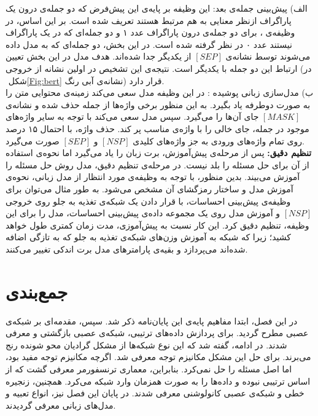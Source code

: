  الف) پیش‌بینی جمله‌ی بعد: این وظیفه بر پایه‌ی این پیش‌فرض که دو جمله‌ی درون یک پاراگراف ازنظر معنایی به هم مرتبط هستند تعریف شده است. بر این اساس،  در وظیفه‌ی ، برای دو جمله‌ی درون پاراگراف عدد ۱ و دو جمله‌ای که در یک پاراگراف نیستند عدد ۰ در نظر گرفته شده است. در این بخش، دو جمله‌ای که به مدل داده می‌شوند توسط نشانه‌ی $[SEP]$ از یکدیگر جدا شده‌اند. هدف مدل در این بخش تعیین ارتباط این دو جمله با یکدیگر است. نتیجه‌ی این تشخیص در اولین نشانه از خروجی (در شکل ‏\ref{Fig:bert} نشانه‌ی آبی رنگ) قرار دارد.\\
 ب) مدل‌سازی زبانی پوشیده : در این وظیفه مدل سعی می‌کند زمینه‌ی محتوایی متن را به صورت دوطرفه یاد بگیرد. به این منظور برخی واژه‌ها از جمله حذف شده و نشانه‌ی $[MASK]$ جای آن‌ها را می‌گیرد. سپس مدل سعی می‌کند با توجه به سایر واژه‌های موجود در جمله، جای خالی را با واژه‌ی مناسب پر کند. حذف واژه، با احتمال ۱۵ درصد روی تمام واژه‌های ورودی به جز واژه‌های کلیدی $[NSP]$ و $[SEP]$ صورت می‌گیرد.
 \\
\textbf{تنظیم دقیق:}
پس از مرحله‌ی پیش‌آموزش، برت زبان را یاد می‌گیرد اما نحوه‌ی استفاده از آن برای حل مسئله را بلد نیست. در مرحله‌ی تنظیم دقیق، مدل روش حل مسئله را آموزش می‌بیند. بدین منظور، با توجه به وظیفه‌ی مورد انتظار از مدل زبانی، نحوه‌ی آموزش مدل و ساختار رمزگشای آن مشخص می‌شود. به طور مثال می‌توان برای وظیفه‌ی پیش‌بینی احساسات، با قرار دادن یک شبکه‌ی تغذیه به جلو روی خروجی $[NSP]$ و آموزش مدل روی یک مجموعه داده‌ی پیش‌بینی احساسات، مدل را برای این وظیفه، تنظیم دقیق کرد. این کار نسبت به پیش‌آموزی، مدت زمان کمتری طول خواهد کشید؛ زیرا که شبکه به آموزش وزن‌های شبکه‌ی تغذیه به جلو که به تازگی اضافه شده‌اند می‌پردازد و بقیه‌ی پارامترهای مدل برت اندکی تغییر می‌کنند.
\section{جمع‌بندی}
در این فصل، ابتدا مفاهیم پایه‌ی این پایان‌نامه ذکر شد. سپس، مقدمه‌ای بر شبکه‌ی عصبی مطرح گردید. برای پردازش داده‌های ترتیبی، شبکه‌ی عصبی بازگشتی و  معرفی شدند. در ادامه، گفته شد که این نوع شبکه‌ها از مشکل گرادیان محو شونده رنج می‌برند. برای حل این مشکل مکانیزم توجه معرفی شد. اگرچه مکانیزم توجه مفید بود، اما اصل مسئله را حل نمی‌کرد. بنابراین، معماری ترنسفورمر معرفی گشت که از اساس ترتیبی نبوده و داده‌ها را به صورت همزمان وارد شبکه می‌کرد. همچنین،  زنجیره خطی و شبکه‌ی عصبی کانولوشنی معرفی شدند. در پایان این فصل نیز، انواع تعبیه و مدل‌های زبانی معرفی گردیدند.
